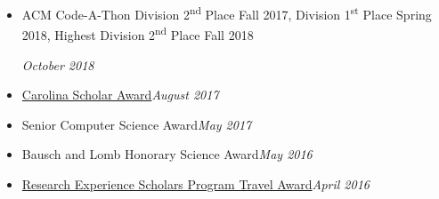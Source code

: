 \documentclass[\ifdefined\cv10pt\else11pt\fi,letterpaper]{moderncv}
\newcommand{\cvonly}[1]{\ifdefined\cv#1\fi\ignorespaces}
\renewcommand{\cvitem}[2]{\item {#1}\hfill\textit{#2}}
\newcommand{\st}{\textsuperscript{st}\xspace}
\newcommand{\nd}{\textsuperscript{nd}\xspace}
\let\oldsection\section
\renewcommand{\section}[1]{\vspace*{-1.3ex}\oldsection{#1}\vspace*{-0.5ex}}
\begin{document}
\begin{itemize}
{	}
	\cvonly{\cvitem{\parbox[t]{0.75\linewidth}{ACM Code-A-Thon Division 2\nd Place Fall 2017, Division 1\st Place Spring 2018, Highest Division 2\nd Place Fall 2018}\vspace*{0.6ex}}{October 2018}}
	\cvitem{\href{https://sc.edu/about/offices_and_divisions/undergraduate_admissions/honors_and_scholars_programs/top_scholars/}{Carolina Scholar Award}}{August 2017}
	\cvonly{\cvitem{Senior Computer Science Award}{May 2017}}
	\cvonly{\cvitem{Bausch and Lomb Honorary Science Award}{May 2016}}
	\cvonly{\cvitem{\href{https://www.scgssm.org/residential/academics/senior-research}{Research Experience Scholars Program Travel Award}}{April 2016}}
\end{itemize}

\end{document}
